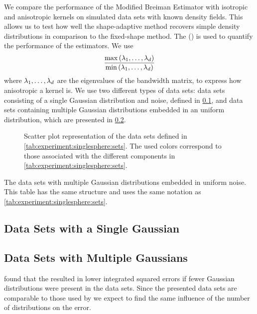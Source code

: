 We compare the performance of the Modified Breiman Estimator with isotropic and anisotropic kernels on simulated data sets with known density fields. This allows us to test how well the shape-adaptive method recovers simple density distributions in comparison to the fixed-shape method. 
The \mse (\MSE) is used to quantify the performance of the estimators. We use
\begin{equation*}\label{eq:experiment:anisotropicmetric}
	\frac{\max\left(\lambda_1, \dotsc, \lambda_d \right)}{\min\left(\lambda_1, \dotsc, \lambda_d \right)}
\end{equation*}
where $\lambda_1, \dotsc, \lambda_d$ are the eigenvalues of the bandwidth matrix, to express how anisotropic a kernel is.
We use two different types of data sets: data sets consisting of a single Gaussian distribution and noise, defined in \cref{s:experiment:singlesphere},  and data sets containing multiple Gaussian distributions embedded in an uniform distribution, which are presented in \cref{s:experiment:multisphere}.

\begin{figure*}
	\centering
	
	\caption{Scatter plot representation of the data sets defined in \cref{tab:experiment:singlesphere:sets}. The used colors correspond to those associated with the different components in \cref{tab:experiment:singlesphere:sets}.}
	\label{fig:experiment:singlesphere:sets}
\end{figure*}

\begin{table*}
	\centering
	
	\caption{The data sets with multiple Gaussian distributions embedded in uniform noise. This table has the same structure and uses the same notation as \cref{tab:experiment:singlesphere:sets}.} 	
	\label{tab:experiment:multisphere:sets}
\end{table*}

\subsection{Data Sets with a Single Gaussian}
\label{s:experiment:singlesphere}


\subsection{Data Sets with Multiple Gaussians}
\label{s:experiment:multisphere}


\textcite{ferdosi2011comparison} found that the \mbe resulted in lower integrated squared errors if fewer Gaussian distributions were present in the data sets. Since the presented data sets are comparable to those used by \citeauthor{ferdosi2011comparison} we expect to find the same influence of the number of distributions on the error.
